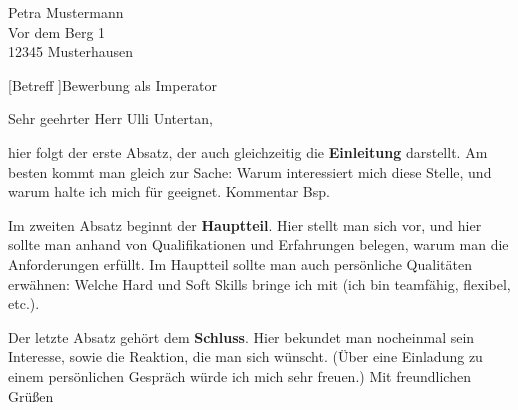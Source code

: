 \emergencystretch=20pt%


\begin{letter}{%
Petra Mustermann\\
Vor dem Berg 1\\
12345 Musterhausen%
}


[Betreff ]{Bewerbung als Imperator}
\opening{Sehr geehrter Herr Ulli Untertan,}

hier folgt der erste Absatz, der auch gleichzeitig die \textbf{Einleitung} darstellt. Am besten kommt man gleich zur Sache: Warum interessiert mich diese Stelle, und warum halte ich mich für geeignet.  Kommentar \glqq Bsp\grqq .

Im zweiten Absatz beginnt der \textbf{Hauptteil}. Hier stellt man sich vor, und hier sollte man anhand von Qualifikationen und Erfahrungen belegen, warum man die Anforderungen erfüllt. Im Hauptteil sollte man auch persönliche Qualitäten erwähnen: Welche Hard und Soft Skills bringe ich mit (ich bin teamfähig, flexibel, etc.).

Der letzte Absatz gehört dem \textbf{Schluss}. Hier bekundet man nocheinmal sein Interesse, sowie die Reaktion, die man sich wünscht. (Über eine Einladung zu einem persönlichen Gespräch würde ich mich sehr freuen.)
\newline\newline\newline 
Mit freundlichen Grüßen\\\sig
\encl{}
\end{letter}
